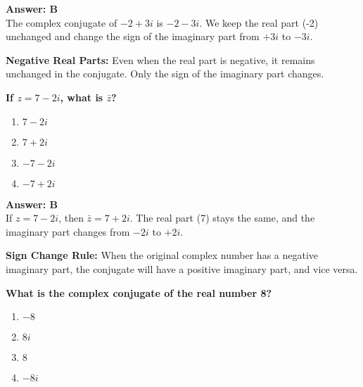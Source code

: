 \documentclass[12pt,a4paper]{article}
\begin{document}
\begin{answerstyle}
\textbf{Answer: B} \\
The complex conjugate of \( -2 + 3i \) is \( -2 - 3i \). We keep the real part (-2) unchanged and change the sign of the imaginary part from \( +3i \) to \( -3i \).
\end{answerstyle}

\begin{conceptbox}
\textbf{Negative Real Parts:} Even when the real part is negative, it remains unchanged in the conjugate. Only the sign of the imaginary part changes.
\end{conceptbox}

\newpage
\begin{questiontitle}[MCQ 34]
\textbf{If \( z = 7 - 2i \), what is \( \bar{z} \)?}
\end{questiontitle}

\begin{partbox}[Options]
\begin{enumerate}[label=\Alph*.]
    \item \( 7 - 2i \)
    \item \( 7 + 2i \)
    \item \( -7 - 2i \)
    \item \( -7 + 2i \)
\end{enumerate}
\end{partbox}

\begin{answerstyle}
\textbf{Answer: B} \\
If \( z = 7 - 2i \), then \( \bar{z} = 7 + 2i \). The real part (7) stays the same, and the imaginary part changes from \( -2i \) to \( +2i \).
\end{answerstyle}

\begin{conceptbox}
\textbf{Sign Change Rule:} When the original complex number has a negative imaginary part, the conjugate will have a positive imaginary part, and vice versa.
\end{conceptbox}

\newpage
\begin{questiontitle}[MCQ 35]
\textbf{What is the complex conjugate of the real number 8?}
\end{questiontitle}

\begin{partbox}[Options]
\begin{enumerate}[label=\Alph*.]
    \item \( -8 \)
    \item \( 8i \)
    \item \( 8 \)
    \item \( -8i \)
\end{enumerate}
\end{partbox}
\end{document}
